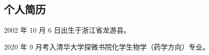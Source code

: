 
\begin{resume}

  \section*{个人简历}

  2002 年 10 月 6 日出生于浙江省龙游县。

  2020 年 9 月考入清华大学探微书院化学生物学（药学方向）专业。








\end{resume}
